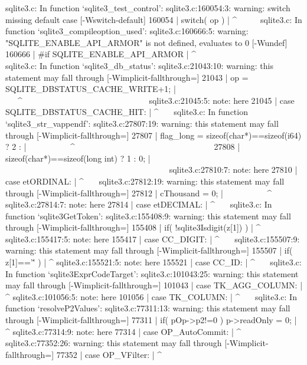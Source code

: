 {{{{{{{{{{{{{{{{{{{{sqlite3.c: In function ‘sqlite3_test_control’:
sqlite3.c:160054:3: warning: switch missing default case [-Wswitch-default]
160054 |   switch( op ){
       |   ^~~~~~
sqlite3.c: In function ‘sqlite3_compileoption_used’:
sqlite3.c:160666:5: warning: "SQLITE_ENABLE_API_ARMOR" is not defined, evaluates to 0 [-Wundef]
160666 | #if SQLITE_ENABLE_API_ARMOR
       |     ^~~~~~~~~~~~~~~~~~~~~~~
sqlite3.c: In function ‘sqlite3_db_status’:
sqlite3.c:21043:10: warning: this statement may fall through [-Wimplicit-fallthrough=]
21043 |       op = SQLITE_DBSTATUS_CACHE_WRITE+1;
      |       ~~~^~~~~~~~~~~~~~~~~~~~~~~~~~~~~~~
sqlite3.c:21045:5: note: here
21045 |     case SQLITE_DBSTATUS_CACHE_HIT:
      |     ^~~~
sqlite3.c: In function ‘sqlite3_str_vappendf’:
sqlite3.c:27807:19: warning: this statement may fall through [-Wimplicit-fallthrough=]
27807 |         flag_long = sizeof(char*)==sizeof(i64) ? 2 :
      |         ~~~~~~~~~~^~~~~~~~~~~~~~~~~~~~~~~~~~~~~~~~~~
27808 |                      sizeof(char*)==sizeof(long int) ? 1 : 0;
      |                      ~~~~~~~~~~~~~~~~~~~~~~~~~~~~~~~~~~~~~~~
sqlite3.c:27810:7: note: here
27810 |       case etORDINAL:
      |       ^~~~
sqlite3.c:27812:19: warning: this statement may fall through [-Wimplicit-fallthrough=]
27812 |         cThousand = 0;
      |         ~~~~~~~~~~^~~
sqlite3.c:27814:7: note: here
27814 |       case etDECIMAL:
      |       ^~~~
sqlite3.c: In function ‘sqlite3GetToken’:
sqlite3.c:155408:9: warning: this statement may fall through [-Wimplicit-fallthrough=]
155408 |       if( !sqlite3Isdigit(z[1]) )
       |         ^
sqlite3.c:155417:5: note: here
155417 |     case CC_DIGIT: {
       |     ^~~~
sqlite3.c:155507:9: warning: this statement may fall through [-Wimplicit-fallthrough=]
155507 |       if( z[1]=='\'' ){
       |         ^
sqlite3.c:155521:5: note: here
155521 |     case CC_ID: {
       |     ^~~~
sqlite3.c: In function ‘sqlite3ExprCodeTarget’:
sqlite3.c:101043:25: warning: this statement may fall through [-Wimplicit-fallthrough=]
101043 |     case TK_AGG_COLUMN: {
       |                         ^
sqlite3.c:101056:5: note: here
101056 |     case TK_COLUMN: {
       |     ^~~~
sqlite3.c: In function ‘resolveP2Values’:
sqlite3.c:77311:13: warning: this statement may fall through [-Wimplicit-fallthrough=]
77311 |           if( pOp->p2!=0 ) p->readOnly = 0;
      |             ^
sqlite3.c:77314:9: note: here
77314 |         case OP_AutoCommit:
      |         ^~~~
sqlite3.c:77352:26: warning: this statement may fall through [-Wimplicit-fallthrough=]
77352 |         case OP_VFilter: {
      |                          ^
}}}}}}}}}}}}}}}}}}}}}}}}}}}
